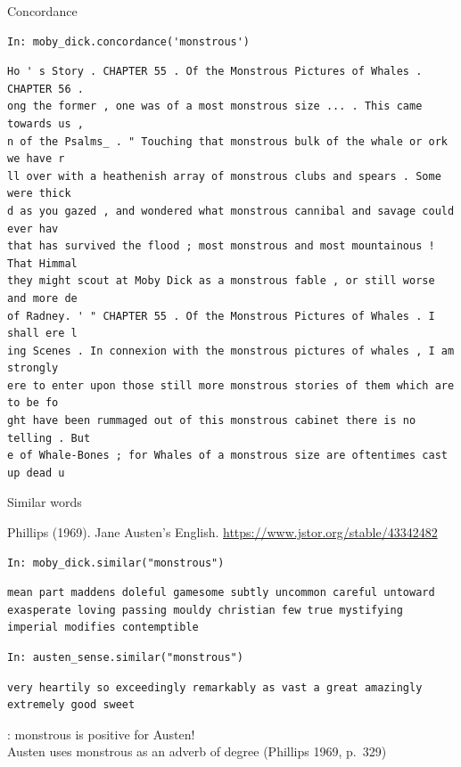 \documentclass[aspectratio=169,usenames,dvipsnames]{beamer}
\begin{document}
\begin{frame}[fragile]{Concordance}
\begin{lstlisting}
In: moby_dick.concordance('monstrous')
\end{lstlisting}
\begin{lstlisting}[style=plainsmaller]
Ho ' s Story . CHAPTER 55 . Of the Monstrous Pictures of Whales . CHAPTER 56 .
ong the former , one was of a most monstrous size ... . This came towards us ,
n of the Psalms_ . " Touching that monstrous bulk of the whale or ork we have r
ll over with a heathenish array of monstrous clubs and spears . Some were thick
d as you gazed , and wondered what monstrous cannibal and savage could ever hav
that has survived the flood ; most monstrous and most mountainous ! That Himmal
they might scout at Moby Dick as a monstrous fable , or still worse and more de
of Radney. ' " CHAPTER 55 . Of the Monstrous Pictures of Whales . I shall ere l
ing Scenes . In connexion with the monstrous pictures of whales , I am strongly
ere to enter upon those still more monstrous stories of them which are to be fo
ght have been rummaged out of this monstrous cabinet there is no telling . But
e of Whale-Bones ; for Whales of a monstrous size are oftentimes cast up dead u
\end{lstlisting}
\end{frame}

\begin{frame}[fragile]{Similar words}
\begin{reference}
Phillips (1969). Jane Austen's English. \url{https://www.jstor.org/stable/43342482}
\end{reference}
\begin{lstlisting}
In: moby_dick.similar("monstrous")
\end{lstlisting}
\begin{lstlisting}[style=plain]
mean part maddens doleful gamesome subtly uncommon careful untoward
exasperate loving passing mouldy christian few true mystifying
imperial modifies contemptible
\end{lstlisting}
\begin{lstlisting}
In: austen_sense.similar("monstrous")
\end{lstlisting}
\begin{lstlisting}[style=plain]
very heartily so exceedingly remarkably as vast a great amazingly
extremely good sweet
\end{lstlisting}

: monstrous is positive for Austen! \\
Austen uses monstrous as an adverb of degree (Phillips 1969, p.\ 329)
\end{frame}
\end{document}
